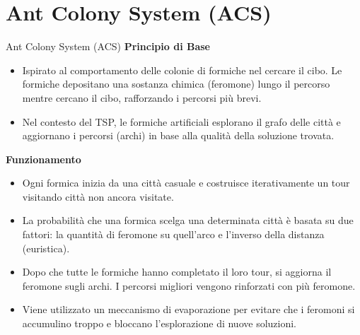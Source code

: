 \documentclass{beamer}
\begin{document}
\section{Ant Colony System (ACS)}
\begin{frame}{Ant Colony System (ACS)}
    \textbf{Principio di Base}
    \begin{itemize}
        \item Ispirato al comportamento delle colonie di formiche nel cercare il cibo. Le formiche depositano una sostanza chimica (feromone) lungo il percorso mentre cercano il cibo, rafforzando i percorsi più brevi.
        \item Nel contesto del TSP, le formiche artificiali esplorano il grafo delle città e aggiornano i percorsi (archi) in base alla qualità della soluzione trovata.
    \end{itemize}

    \textbf{Funzionamento}
    \begin{itemize}
        \item Ogni formica inizia da una città casuale e costruisce iterativamente un tour visitando città non ancora visitate.
        \item La probabilità che una formica scelga una determinata città è basata su due fattori: la quantità di feromone su quell’arco e l'inverso della distanza (euristica).
        \item Dopo che tutte le formiche hanno completato il loro tour, si aggiorna il feromone sugli archi. I percorsi migliori vengono rinforzati con più feromone.
        \item Viene utilizzato un meccanismo di evaporazione per evitare che i feromoni si accumulino troppo e bloccano l'esplorazione di nuove soluzioni.
    \end{itemize}


\end{frame}
\end{document}
